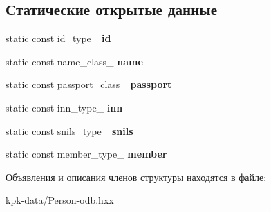 \subsection*{Статические открытые данные}
\begin{DoxyCompactItemize}
\item 
static const id\+\_\+type\+\_\+ {\bfseries id}\hypertarget{structodb_1_1query__columns_3_01_1_1kpk_1_1data_1_1_person_00_01id__pgsql_00_01_a_01_4_a37907f579bf53b3e556fdedf356bc8dd}{}\label{structodb_1_1query__columns_3_01_1_1kpk_1_1data_1_1_person_00_01id__pgsql_00_01_a_01_4_a37907f579bf53b3e556fdedf356bc8dd}

\item 
static const name\+\_\+class\+\_\+ {\bfseries name}\hypertarget{structodb_1_1query__columns_3_01_1_1kpk_1_1data_1_1_person_00_01id__pgsql_00_01_a_01_4_aec0a0c13a4d9aa71111721b8194c6ef2}{}\label{structodb_1_1query__columns_3_01_1_1kpk_1_1data_1_1_person_00_01id__pgsql_00_01_a_01_4_aec0a0c13a4d9aa71111721b8194c6ef2}

\item 
static const passport\+\_\+class\+\_\+ {\bfseries passport}\hypertarget{structodb_1_1query__columns_3_01_1_1kpk_1_1data_1_1_person_00_01id__pgsql_00_01_a_01_4_aeaeefee317b447eb75e81d110732fa3c}{}\label{structodb_1_1query__columns_3_01_1_1kpk_1_1data_1_1_person_00_01id__pgsql_00_01_a_01_4_aeaeefee317b447eb75e81d110732fa3c}

\item 
static const inn\+\_\+type\+\_\+ {\bfseries inn}\hypertarget{structodb_1_1query__columns_3_01_1_1kpk_1_1data_1_1_person_00_01id__pgsql_00_01_a_01_4_af258fca783dc7acf5e8513418625ec15}{}\label{structodb_1_1query__columns_3_01_1_1kpk_1_1data_1_1_person_00_01id__pgsql_00_01_a_01_4_af258fca783dc7acf5e8513418625ec15}

\item 
static const snils\+\_\+type\+\_\+ {\bfseries snils}\hypertarget{structodb_1_1query__columns_3_01_1_1kpk_1_1data_1_1_person_00_01id__pgsql_00_01_a_01_4_ae104883646ae4a347d0b5c9f276808f5}{}\label{structodb_1_1query__columns_3_01_1_1kpk_1_1data_1_1_person_00_01id__pgsql_00_01_a_01_4_ae104883646ae4a347d0b5c9f276808f5}

\item 
static const member\+\_\+type\+\_\+ {\bfseries member}\hypertarget{structodb_1_1query__columns_3_01_1_1kpk_1_1data_1_1_person_00_01id__pgsql_00_01_a_01_4_ac55b0dcaca42ee30d614db8189b6144c}{}\label{structodb_1_1query__columns_3_01_1_1kpk_1_1data_1_1_person_00_01id__pgsql_00_01_a_01_4_ac55b0dcaca42ee30d614db8189b6144c}

\end{DoxyCompactItemize}


Объявления и описания членов структуры находятся в файле\+:\begin{DoxyCompactItemize}
\item 
kpk-\/data/Person-\/odb.\+hxx\end{DoxyCompactItemize}
